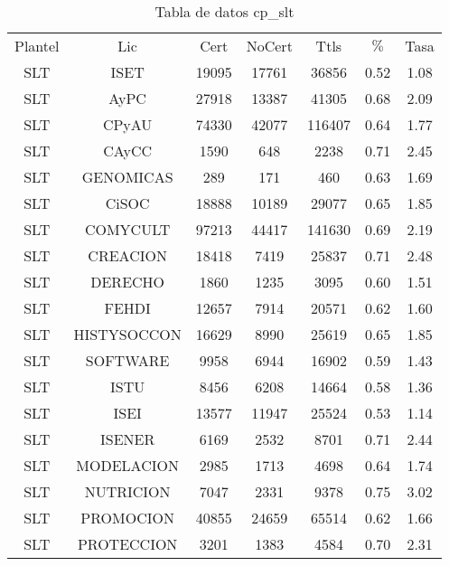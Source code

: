 \documentclass{article}
\begin{document}
\begin{table}[h]
\centering
\begin{tabular}{ccccccc}

Plantel & Lic & Cert & NoCert & Ttls & $\%$ & Tasa \\

SLT & ISET & 19095 & 17761 & 36856 & 0.52 & 1.08 \\
SLT & AyPC & 27918 & 13387 & 41305 & 0.68 & 2.09 \\
SLT & CPyAU & 74330 & 42077 & 116407 & 0.64 & 1.77 \\
SLT & CAyCC & 1590 & 648 & 2238 & 0.71 & 2.45 \\
SLT & GENOMICAS & 289 & 171 & 460 & 0.63 & 1.69 \\
SLT & CiSOC & 18888 & 10189 & 29077 & 0.65 & 1.85 \\
SLT & COMYCULT & 97213 & 44417 & 141630 & 0.69 & 2.19 \\
SLT & CREACION & 18418 & 7419 & 25837 & 0.71 & 2.48 \\
SLT & DERECHO & 1860 & 1235 & 3095 & 0.60 & 1.51 \\
SLT & FEHDI & 12657 & 7914 & 20571 & 0.62 & 1.60 \\
SLT & HISTYSOCCON & 16629 & 8990 & 25619 & 0.65 & 1.85 \\
SLT & SOFTWARE & 9958 & 6944 & 16902 & 0.59 & 1.43 \\
SLT & ISTU & 8456 & 6208 & 14664 & 0.58 & 1.36 \\
SLT & ISEI & 13577 & 11947 & 25524 & 0.53 & 1.14 \\
SLT & ISENER & 6169 & 2532 & 8701 & 0.71 & 2.44 \\
SLT & MODELACION & 2985 & 1713 & 4698 & 0.64 & 1.74 \\
SLT & NUTRICION & 7047 & 2331 & 9378 & 0.75 & 3.02 \\
SLT & PROMOCION & 40855 & 24659 & 65514 & 0.62 & 1.66 \\
SLT & PROTECCION & 3201 & 1383 & 4584 & 0.70 & 2.31 \\

\end{tabular}
\caption{Tabla de datos cp\_slt}
\end{table}
\end{document}
